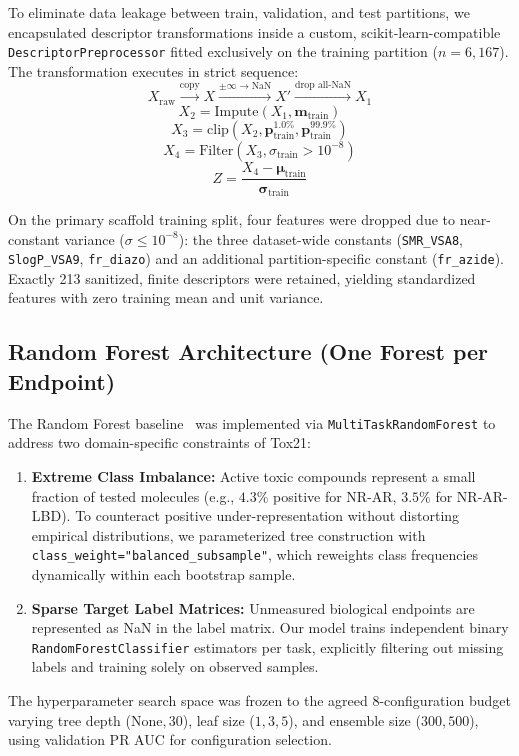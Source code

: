 To eliminate data leakage between train, validation, and test partitions, we encapsulated descriptor transformations inside a custom, scikit-learn-compatible \texttt{DescriptorPreprocessor} fitted exclusively on the training partition ($n = 6{,}167$). The transformation executes in strict sequence:
\begin{equation}
    X_{\text{raw}} \xrightarrow{\text{copy}} X \xrightarrow{\pm\infty \to \text{NaN}} X' \xrightarrow{\text{drop all-NaN}} X_1
\end{equation}
\begin{equation}
    X_2 = \text{Impute}(X_1, \mathbf{m}_{\text{train}})
\end{equation}
\begin{equation}
    X_3 = \text{clip}(X_2, \mathbf{p}_{\text{train}}^{1.0\%}, \mathbf{p}_{\text{train}}^{99.9\%})
\end{equation}
\begin{equation}
    X_4 = \text{Filter}(X_3, \sigma_{\text{train}} > 10^{-8})
\end{equation}
\begin{equation}
    Z = \frac{X_4 - \boldsymbol{\mu}_{\text{train}}}{\boldsymbol{\sigma}_{\text{train}}}
\end{equation}

On the primary scaffold training split, four features were dropped due to near-constant variance ($\sigma \le 10^{-8}$): the three dataset-wide constants (\texttt{SMR\_VSA8}, \texttt{SlogP\_VSA9}, \texttt{fr\_diazo}) and an additional partition-specific constant (\texttt{fr\_azide}). Exactly 213 sanitized, finite descriptors were retained, yielding standardized features with zero training mean and unit variance.

\subsection{Random Forest Architecture (One Forest per Endpoint)}
\label{subsec:rf}
The Random Forest baseline~\cite{breiman2001random} was implemented via \texttt{MultiTaskRandomForest} to address two domain-specific constraints of Tox21:
\begin{enumerate}
    \item \textbf{Extreme Class Imbalance:} Active toxic compounds represent a small fraction of tested molecules (e.g., $4.3\%$ positive for NR-AR, $3.5\%$ for NR-AR-LBD). To counteract positive under-representation without distorting empirical distributions, we parameterized tree construction with \texttt{class\_weight="balanced\_subsample"}, which reweights class frequencies dynamically within each bootstrap sample.
    \item \textbf{Sparse Target Label Matrices:} Unmeasured biological endpoints are represented as NaN in the label matrix. Our model trains independent binary \texttt{RandomForestClassifier} estimators per task, explicitly filtering out missing labels and training solely on observed samples.
\end{enumerate}
The hyperparameter search space was frozen to the agreed 8-configuration budget varying tree depth ($\text{None}, 30$), leaf size ($1, 3, 5$), and ensemble size ($300, 500$), using validation PR AUC for configuration selection.

